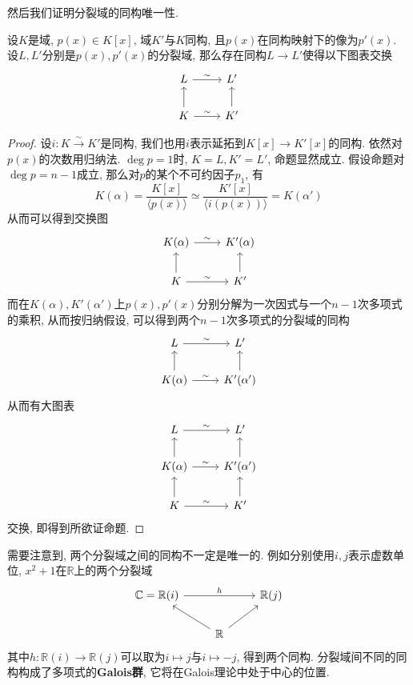 然后我们证明分裂域的同构唯一性.
\begin{thm}[分裂域的同构唯一性]
    设$K$是域, $p(x)\in K[x]$, 域$K'$与$K$同构, 且$p(x)$在同构映射下的像为$p'(x)$.
    设$L,L'$分别是$p(x),p'(x)$的分裂域, 那么存在同构$L\to L'$使得以下图表交换
    \[\begin{tikzcd}
        L\ar[r, "\sim"] & L'\\
        K\ar[r, "\sim"] \ar[u] & K' \ar[u]
    \end{tikzcd}\]
\end{thm}
\begin{proof}
    设$i:K\xrightarrow{\sim}K'$是同构, 我们也用$i$表示延拓到$K[x]\to K'[x]$的同构.
    依然对$p(x)$的次数用归纳法.
    $\deg{p}=1$时, $K=L,K'=L'$, 命题显然成立.
    假设命题对$\deg{p}=n-1$成立, 那么对$p$的某个不可约因子$p_1$, 有
    \[K(\alpha)=\frac{K[x]}{\langle p(x)\rangle}\simeq\frac{K'[x]}{\langle i(p(x))\rangle}=K(\alpha')\]
    从而可以得到交换图
    \[\begin{tikzcd}
        K(\alpha)\ar[r,"\sim"] & K'(\alpha)\\
        K\ar[u]\ar[r,"\sim"] & K'\ar[u]
    \end{tikzcd}\]
    而在$K(\alpha),K'(\alpha')$上$p(x),p'(x)$分别分解为一次因式与一个$n-1$次多项式的乘积, 从而按归纳假设, 可以得到两个$n-1$次多项式的分裂域的同构
    \[\begin{tikzcd}
        L\ar[r, "\sim"] & L'\\
        K(\alpha)\ar[r, "\sim"] \ar[u] & K'(\alpha') \ar[u]
    \end{tikzcd}\]
    从而有大图表
    \[\begin{tikzcd}
        L\ar[r, "\sim"] & L'\\
        K(\alpha)\ar[r, "\sim"] \ar[u] & K'(\alpha') \ar[u]\\
        K\ar[r,"\sim"] \ar[u] & K'\ar[u]
    \end{tikzcd}\]
    交换, 即得到所欲证命题.
\end{proof}

\begin{rem}
    需要注意到, 两个分裂域之间的同构不一定是唯一的.
    例如分别使用$i,j$表示虚数单位, $x^2+1$在$\mathbb{R}$上的两个分裂域
    \[\begin{tikzcd}
        \mathbb{C}=\mathbb{R}(i)\ar[rr, "h"] & & \mathbb{R}(j)\\
        & \mathbb{R}\ar[ul] \ar[ur] &
    \end{tikzcd}\]
    其中$h:\mathbb{R}(i)\to\mathbb{R}(j)$可以取为$i\mapsto j$与$i\mapsto -j$, 得到两个同构.
    分裂域间不同的同构构成了多项式的\textbf{Galois群}, 它将在Galois理论中处于中心的位置.
\end{rem}

